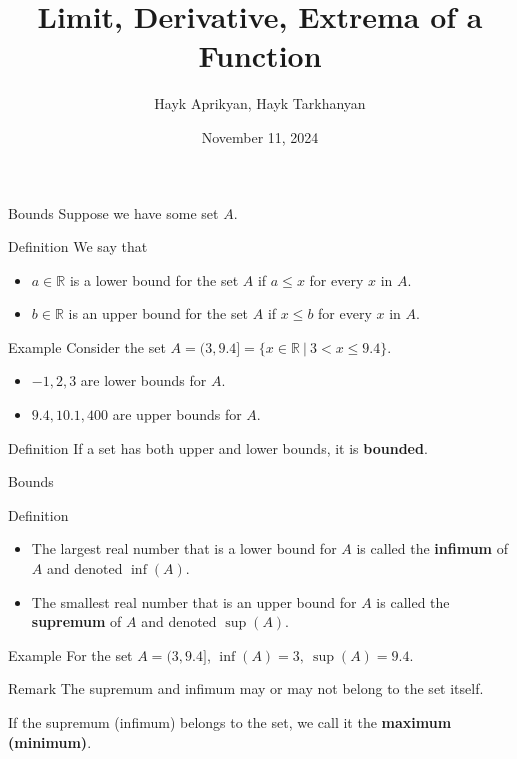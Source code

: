 \documentclass{beamer}
\title[Lecture 5]{Limit, Derivative, Extrema of a Function}
\author[Aprikyan, Tarkhanyan]{Hayk Aprikyan, Hayk Tarkhanyan}
\institute[ACA]{Armenian Code Academy}
\date{November 11, 2024}
\newcommand{\R}{\mathbb{R}}
\begin{document}
\begin{frame}
  \titlepage
\end{frame}


\begin{frame}{Bounds}
Suppose we have some set $A$.
\pause
    \begin{block}{Definition}
    We say that
        \begin{itemize}
            \item $a\in\R$ is a lower bound for the set $A$ if $a\leq x$ for every $x$ in $A$.
            \item $b\in\R$ is an upper bound for the set $A$ if $x \leq b$ for every $x$ in $A$.
        \end{itemize}
    \end{block}
\pause
    \begin{exampleblock}{Example}
        Consider the set $A = (3, 9.4]=\{x\in \R \:\vert\: 3<x\le 9.4\}$.

        \begin{itemize}
            \item $-1, 2, 3$ are lower bounds for $A$.
            \item $9.4, 10.1, 400$ are upper bounds for $A$.
        \end{itemize}
    \end{exampleblock}
\pause
    \begin{block}{Definition}
        If a set has both upper and lower bounds, it is \textbf{bounded}.
    \end{block}
\end{frame}


\begin{frame}{Bounds}
    \begin{block}{Definition}
        \begin{itemize}
            \item The largest real number that is a lower bound for $A$ is called the \textbf{infimum} of $A$ and denoted $\inf(A)$.
            
            \item The smallest real number that is an upper bound for $A$ is called the \textbf{supremum} of $A$ and denoted $\sup(A)$.
            
        \end{itemize}
    \end{block}
\pause

    \begin{exampleblock}{Example}
        For the set $A = (3, 9.4]$, $\inf(A)=3, \: \sup(A)=9.4$.
    \end{exampleblock}
\pause

    \begin{block}{Remark}
        The supremum and infimum may or may not belong to the set itself.
    \end{block}
    If the supremum (infimum) belongs to the set, we call it the \textbf{maximum} \textbf{(minimum)}.
\end{frame}
\end{document}
